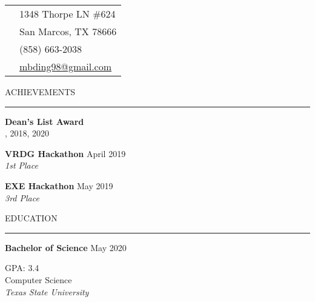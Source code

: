 \documentclass[letterpaper, 10pt]{resume}
\renewenvironment{rSection}[1]{
\sectionskip
\textcolor{blue-violet}{\MakeUppercase{#1}}
\sectionlineskip
\hrule
\begin{list}{}{
	\setlength{\leftmargin}{1.5em}
}
	\item[]
}{
\end{list}
}
\begin{document}
\begin{multicols}{2}
\begin{tcolorbox}
 \begin{tabular}{c|p{7cm}}
	\raisebox{-1pt}{\textifsymbol{18}} & 1348 Thorpe LN \#624 \\
	 & San Marcos, TX 78666 \\ %
	{\Mobilefone} & (858) 663-2038 \\ %
	{\Letter} & \href{mailto:mbding98@gmail.com}{mbding98@gmail.com}
\end{tabular}
\end{tcolorbox}

\begin{rSection}{Achievements}
\color{black}
	
	\begin{flushleft}
	{\bf Dean's List Award} \\
	{, 2018, 2020 \\ }
	\end{flushleft}
	
	\begin{flushleft}
	{\bf VRDG Hackathon} \hfill April 2019 \\
	{\raggedleft \em 1st Place \\}
	\end{flushleft}
	
	\begin{flushleft}
	{\bf EXE Hackathon} \hfill May 2019 \\
	{\raggedleft \em 3rd Place\\}
	\end{flushleft}
	
\end{rSection}

\begin{rSection}{Education}
\color{black}

	\begin{flushleft}
	{{\bf Bachelor of Science} \hfill May 2020 } \\
	\end{flushleft}
	{\raggedleft GPA: 3.4 \\ Computer Science \\ {\em Texas State University} \\}
	
\end{rSection}


\end{multicols}
\end{document}
